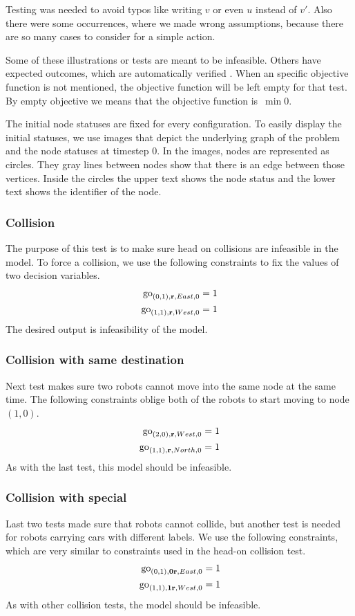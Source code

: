 Testing was needed to avoid typos like writing $v$ or even $u$ instead of $v'$.
Also there were some occurrences, where we made wrong assumptions, because there
are so many cases to consider for a simple action.

Some of these illustrations or tests are meant to be infeasible. Others have
expected outcomes, which are automatically verified . When an specific
objective function is not mentioned, the objective function will be left empty
for that test. By empty objective we means that the objective function is~$\min
0$.

The initial node statuses are fixed for every configuration. To easily display
the initial statuses, we use images that depict the underlying graph of the
problem and the node statuses at timestep 0. In the images, nodes are
represented as circles. They gray lines between nodes show that there is an
edge between those vertices. Inside the circles the upper text shows the node
status and the lower text shows the identifier of the node.
\subsubsection{Collision}
The purpose of this test is to make sure head on collisions are infeasible in
the model.
To force a collision, we use the following constraints to fix the values of two decision
variables.
\begin{align}
    \mathrm{go}_{(0,1),\text{\bf r},East,0} &= 1\\
    \mathrm{go}_{(1,1),\text{\bf r},West,0} &= 1
\end{align}
The desired output is infeasibility of the model.
\subsubsection{Collision with same destination}
Next test makes sure two robots cannot move into the same node at the same
time.
The following constraints oblige both of the robots to start moving to node $(1,0)$.
\begin{align}
    \mathrm{go}_{(2,0),\text{\bf r},West,0} &= 1\\
    \mathrm{go}_{(1,1),\text{\bf r},North,0} &= 1
\end{align}
As with the last test, this model should be infeasible.
\subsubsection{Collision with special}
Last two tests made sure that robots cannot collide, but another test is needed
for robots carrying cars with different labels.
We use the following constraints, which are very similar to constraints used in
the head-on collision test.
\begin{align}
    \mathrm{go}_{(0,1),\text{\bf 0r},East,0} &= 1\\
    \mathrm{go}_{(1,1),\text{\bf 1r},West,0} &= 1
\end{align}
As with other collision tests, the model should be infeasible.
